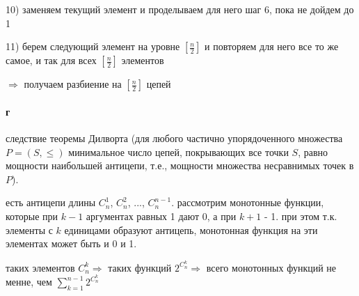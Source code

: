 \documentclass[russian]{article}
\begin{document}
10) заменяем текущий элемент и проделываем для него шаг 6, пока не дойдем до 1

11) берем следующий элемент на уровне $[\frac{n}{2}]$ и повторяем для него все то же самое, и так для всех $[\frac{n}{2}]$ элементов

$\Rightarrow $ получаем разбиение на $[\frac{n}{2}]$ цепей
\paragraph*{г}

следствие теоремы Дилворта (для любого частично упорядоченного множества $P = (S, \le)$ минимальное число цепей, покрывающих все точки $S$, равно мощности наибольшей антицепи, т.е., мощности множества несравнимых точек в $P$).

есть антицепи длины $C_n^1$, $C_n^2$, ..., $C_n^{n-1}$. рассмотрим монотонные функции, которые при $k-1$ аргументах равных 1 дают 0, а при $k+1$ - 1. при этом т.к. элементы с $k$ единицами образуют антицепь, монотонная функция на эти элементах может быть и 0 и 1.

таких элементов $C_n^k \Rightarrow $ таких функций $2^{C_n^k} \Rightarrow $ всего монотонных функций не менне, чем $\sum _{k=1}^{n-1} 2^{C_n^k}$
\end{document}
